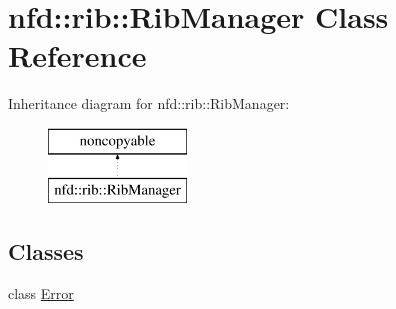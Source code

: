 \hypertarget{classnfd_1_1rib_1_1RibManager}{}\section{nfd\+:\+:rib\+:\+:Rib\+Manager Class Reference}
\label{classnfd_1_1rib_1_1RibManager}
Inheritance diagram for nfd\+:\+:rib\+:\+:Rib\+Manager\+:\begin{figure}[H]
\begin{center}
\leavevmode
\includegraphics[height=2.000000cm]{classnfd_1_1rib_1_1RibManager}
\end{center}
\end{figure}
\subsection*{Classes}
\begin{DoxyCompactItemize}
\item 
class \hyperlink{classnfd_1_1rib_1_1RibManager_1_1Error}{Error}
\end{DoxyCompactItemize}
